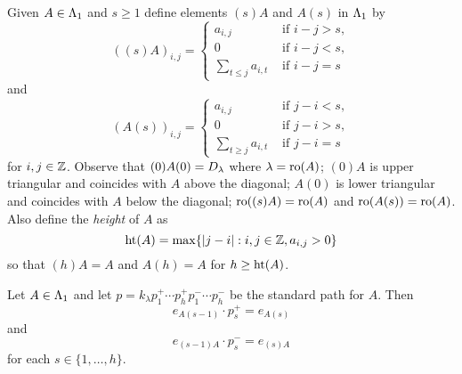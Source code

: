 \documentclass[a4paper, 11pt, twoside]{report}
\begin{document}
Given $A\in\Lambda_1{}$ and $s\geq 1$ define elements $(s)A$ and $A(s)$ in $\Lambda_1{}$ by
\begin{equation*}
\left((s)A\right)_{i,j} = \begin{cases}
a_{i,j} &\text{ if } i-j>s,\\
0 &\text{ if } i-j<s,\\
\sum_{t\le j} a_{i,t} &\text{ if } i-j=s
\end{cases}
\end{equation*}
and
\begin{equation*}
\left(A(s)\right)_{i,j} = \begin{cases}
a_{i,j} &\text{ if } j-i<s,\\
0 &\text{ if } j-i>s,\\
\sum_{t\geq j} a_{i,t} &\text{ if } j-i=s
\end{cases}
\end{equation*}
for $i,j\in\mathbb{Z}$. Observe that $(0)A(0)=D_{\lambda}$ where $\lambda=\operatorname{ro}(A)$; $(0)A$ is upper triangular and coincides with $A$ above the diagonal; $A(0)$ is lower triangular and coincides with $A$ below the diagonal; $\operatorname{ro}((s)A)=\operatorname{ro}(A)$ and $\operatorname{ro}(A(s))=\operatorname{ro}(A)$. Also define the \emph{height} of $A$ as
\begin{equation*}
\operatorname{ht}(A) = \max\{|j-i|:i,j\in\mathbb{Z}, a_{i,j}>0\}
\end{equation*}
so that $(h)A=A$ and $A(h)=A$ for $h\geq\operatorname{ht}(A)$.

\begin{lemma}\label{lemma:slice-by-slice}
Let $A\in\Lambda_1{}$ and let $p=k_\lambda p_1^+ \cdots p_h^+ p_1^-\cdots p_h^-$ be the standard path for $A$. Then
\begin{equation*}
e_{A(s-1)}\cdot p_s^+ = e_{A(s)}
\end{equation*}
and
\begin{equation*}
e_{(s-1)A}\cdot p_s^- = e_{(s)A}
\end{equation*}
for each $s\in\{1,\ldots,h\}$.
\end{lemma}
\end{document}
